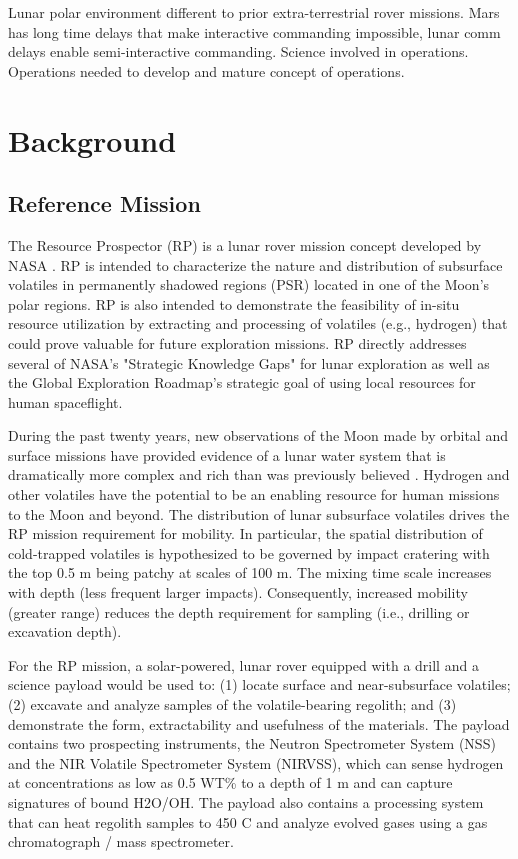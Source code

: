 \documentclass[twocolumn,letterpaper]{IEEEAerospaceCLS}  %
\begin{document}
Lunar polar environment different to prior extra-terrestrial rover missions. Mars has long time delays that make interactive commanding impossible, lunar comm delays enable semi-interactive commanding. Science involved in operations. Operations needed to develop and mature concept of operations.  

\section{Background}
\label{sec:background}

\subsection{Reference Mission}
The Resource Prospector (RP) is a lunar rover mission concept developed by NASA \cite{andrews2015resource,colaprete2015resource}. 
RP is intended to characterize the nature and distribution of subsurface volatiles in permanently shadowed regions (PSR) located in one of the Moon's polar regions. 
RP is also intended to demonstrate the feasibility of in-situ resource utilization by extracting and processing of volatiles (e.g., hydrogen) that could prove valuable for future exploration missions. 
RP directly addresses several of NASA's "Strategic Knowledge Gaps" for lunar exploration as well as the Global Exploration Roadmap's strategic goal of using local resources for human spaceflight.

During the past twenty years, new observations of the Moon made by orbital and surface missions have provided evidence of a lunar water system that is dramatically more complex and rich than was previously believed \cite{colaprete2017resource}. 
Hydrogen and other volatiles have the potential to be an enabling resource for human missions to the Moon and beyond. 
The distribution of lunar subsurface volatiles drives the RP mission requirement for mobility. 
In particular, the spatial distribution of cold-trapped volatiles is hypothesized to be governed by impact cratering with the top 0.5 m being patchy at scales of 100 m. 
The mixing time scale increases with depth (less frequent larger impacts). 
Consequently, increased mobility (greater range) reduces the depth requirement for sampling (i.e., drilling or excavation depth).

For the RP mission, a solar-powered, lunar rover equipped with a drill and a science payload would be used to: (1) locate surface and near-subsurface volatiles; (2) excavate and analyze samples of the volatile-bearing regolith; and (3) demonstrate the form, extractability and usefulness of the materials. 
The payload contains two prospecting instruments, the Neutron Spectrometer System (NSS) and the NIR Volatile Spectrometer System (NIRVSS), which can sense hydrogen at concentrations as low as 0.5 WT\% to a depth of 1 m and can capture signatures of bound H2O/OH. 
The payload also contains a processing system that can heat regolith samples to 450 C and analyze evolved gases using a gas chromatograph / mass spectrometer.
\end{document}
